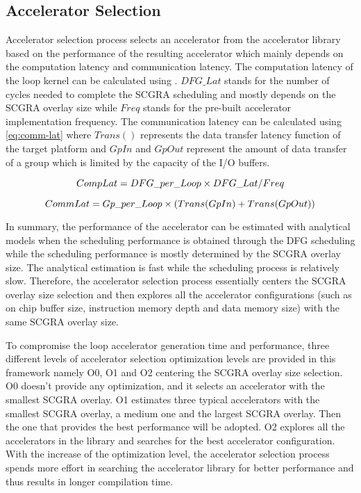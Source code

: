 \subsection{Accelerator Selection} \label{sec:accel-sel}
Accelerator selection process selects an accelerator from the accelerator library based on the performance of the resulting accelerator which mainly depends on the computation latency and communication latency. The computation latency of the loop kernel can be calculated using . $DFG\_Lat$ stands for the number of cycles needed to complete the SCGRA scheduling and mostly depends on the SCGRA overlay size while $Freq$ stands for the pre-built accelerator implementation frequency. The communication latency can be calculated using \eqref{eq:comm-lat} where $Trans()$ represents the data transfer latency function of the target platform and $GpIn$ and $GpOut$ represent the amount of data transfer of a group which is limited by the capacity of the I/O buffers. 

\begin{equation} \label{eq:comp-lat}
    \footnotesize
    CompLat = DFG\_per\_Loop \times DFG\_Lat / Freq
\end{equation}


\begin{equation} \label{eq:comm-lat}
    \footnotesize
    CommLat = Gp\_per\_Loop \times (Trans(GpIn) + Trans(GpOut))
\end{equation}


In summary, the performance of the accelerator can be estimated with analytical models when the scheduling performance is obtained through the DFG scheduling while the scheduling performance is mostly determined by the SCGRA overlay size. The analytical estimation is fast while the scheduling process is relatively slow. Therefore, the accelerator selection process essentially centers the SCGRA overlay size selection and then explores all the accelerator configurations (such as on chip buffer size, instruction memory depth and data memory size) with the same SCGRA overlay size. 

To compromise the loop accelerator generation time and performance, three different levels of accelerator selection optimization levels are provided in this framework namely O0, O1 and O2 centering the SCGRA overlay size selection. O0 doesn't provide any optimization, and it selects an accelerator with the smallest SCGRA overlay. O1 estimates three typical accelerators with the smallest SCGRA overlay, a medium one and the largest SCGRA overlay. Then the one that provides the best performance will be adopted. O2 explores all the accelerators in the library and searches for the best accelerator configuration. With the increase of the optimization level, the accelerator selection process spends more effort in searching the accelerator library for better performance and thus results in longer compilation time.

